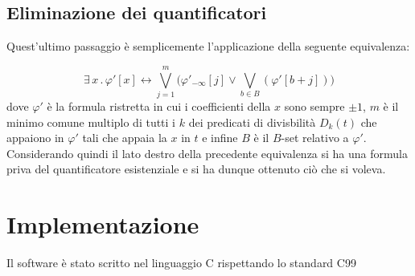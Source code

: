 \documentclass[11pt,letterpaper,twoside]{article}
\begin{document}
\subsection{Eliminazione dei quantificatori}
Quest'ultimo passaggio \`e semplicemente l'applicazione della seguente
equivalenza:

$$ \exists \, x \, . \, \varphi'[x] \longleftrightarrow \bigvee_{j=1}^m \Big(
\varphi'_{- \infty}[j] \lor \bigvee_{b \in B}(\varphi'[b+j]) \Big)$$
dove $\varphi'$ \`e la formula ristretta in cui i coefficienti della $x$ sono
sempre $\pm 1$, $m$ \`e il minimo comune multiplo di tutti i $k$ dei predicati
di divisbilit\`a $D_k(t)$ che appaiono in $\varphi'$ tali che appaia la $x$ in
$t$ e infine $B$ \`e il $B$-set relativo a $\varphi'$.
Considerando quindi il lato destro della precedente equivalenza si ha una
formula priva del quantificatore esistenziale e si ha dunque ottenuto ci\`o che
si voleva.

\section{Implementazione}
Il software \`e stato scritto nel linguaggio C rispettando lo standard C99
\end{document}
